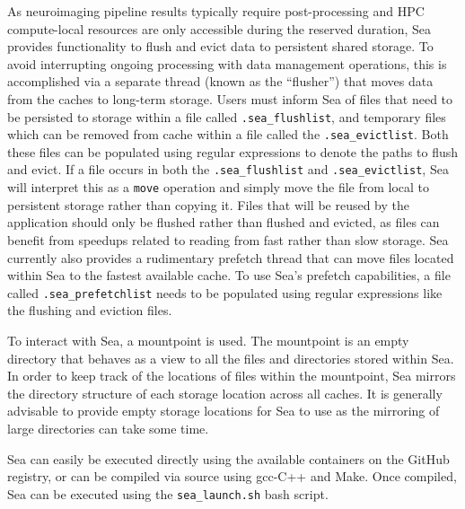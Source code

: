 \documentclass[fleqn,10pt]{wlscirep}
\begin{document}
    As neuroimaging pipeline results typically require post-processing and
    HPC compute-local resources are only accessible during the reserved
    duration, Sea provides functionality to flush and evict data to persistent
    shared storage. To avoid interrupting ongoing
    processing with data management operations, this is accomplished via a separate thread (known as the
    ``flusher'') that moves data from the caches to long-term storage. Users must inform Sea of files
    that need to be persisted to storage within a file called
    \texttt{.sea\_flushlist}, and temporary files which can be removed from
    cache within a file called the \texttt{.sea\_evictlist}. Both these files
    can be populated using regular expressions to denote the paths to flush and
    evict. If a file occurs in both the \texttt{.sea\_flushlist} and
    \texttt{.sea\_evictlist}, Sea will interpret this as a \texttt{move}
    operation and simply move the file from local to persistent storage rather
    than copying it. Files that will be reused by the application should only be
    flushed rather than flushed and evicted, as files can benefit from speedups
    related to reading from fast rather than slow storage. Sea currently also
    provides a rudimentary prefetch thread that can move files located within
    Sea to the fastest available cache. To use Sea's prefetch
    capabilities, a file called \texttt{.sea\_prefetchlist} needs to be
    populated using regular expressions like the flushing and eviction files.
    
    To interact with Sea, a mountpoint is used. The mountpoint
    is an empty directory that behaves as a view to all the files and
    directories stored within Sea. In order to keep track of the locations of
    files within the mountpoint, Sea mirrors the directory structure of each
    storage location across all caches. It is generally advisable to provide
    empty storage locations for Sea to use as the mirroring of large directories
    can take some time.
    
    Sea can easily be executed directly using the available containers on the
    GitHub registry, or can be compiled via source using gcc-C++ and Make. Once
    compiled, Sea can be executed using the \texttt{sea\_launch.sh} bash script.
\end{document}
